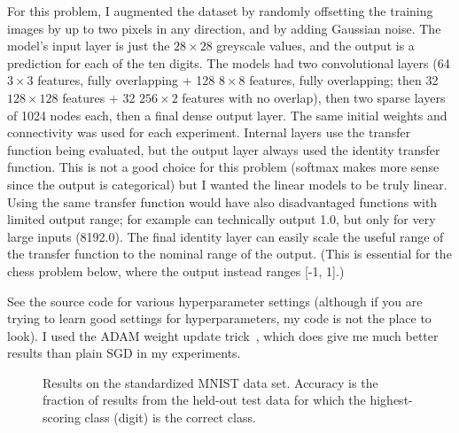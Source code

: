 \documentclass[twocolumn]{article}
\newcommand\xbyx[2]{\ensuremath{#1 {\times} #2}}
\begin{document}
For this problem, I augmented the dataset by randomly offsetting the
training images by up to two pixels in any direction, and by adding
Gaussian noise. The model's input layer is just the $28 \times 28$
greyscale values, and the output is a prediction for each of the ten
digits. The models had two convolutional layers (64 \xbyx{3}{3} features,
fully overlapping + 128 \xbyx{8}{8} features, fully overlapping; then
32 \xbyx{128}{128} features + 32 \xbyx{256}{2} features with no
overlap), then two sparse layers of 1024 nodes each, then a final
dense output layer. The same initial weights and connectivity was used
for each experiment. Internal layers use the transfer function being
evaluated, but the output layer always used the identity transfer
function. This is not a good choice for this problem (softmax makes
more sense since the output is categorical) but I wanted the linear
models to be truly linear. Using the same transfer function would have
also disadvantaged functions with limited output range; \downshifttwo
for example can technically output 1.0, but only for very large inputs
(8192.0). The final identity layer can easily scale the useful range
of the transfer function to the nominal range of the output. (This is
essential for the chess problem below, where the output instead ranges
[-1, 1].)

See the source code for various hyperparameter settings (although if
you are trying to learn good settings for hyperparameters, my code is
not the place to look). I used the ADAM weight update
trick~\cite{kingma2014adam}, which does give me much better results
than plain SGD in my experiments.

\begin{figure}[htp]
  
  \caption{
    Results on the standardized MNIST data set. Accuracy is the
    fraction of results from the held-out test data for which the
    highest-scoring class (digit) is the correct class.
  } \label{fig:mnistresults}
\end{figure}
\end{document}
